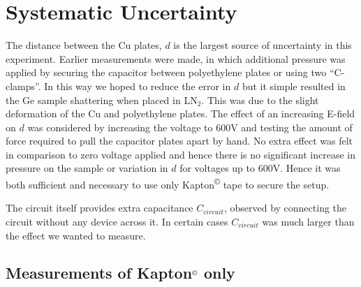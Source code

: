 \documentclass[a4paper,11pt]{article}
\begin{document}
\section{Systematic Uncertainty}
\label{s:sysUncertainty}

The distance between the Cu plates, $d$ is the largest source of uncertainty in this experiment. Earlier measurements were made, in which additional pressure was applied by securing the capacitor between polyethylene plates or using two ``C-clamps''. In this way we hoped to reduce the error in $d$ but it simple resulted in the Ge sample shattering when placed in LN$_{2}$. This was due to the slight deformation of the Cu and polyethylene plates. The effect of an increasing E-field on $d$ was considered by increasing the voltage to 600V and testing the amount of force required to pull the capacitor plates apart by hand. No extra effect was felt in comparison to zero voltage applied and hence there is no significant increase in pressure on the sample or variation in $d$ for voltages up to 600V. Hence it was both sufficient and necessary to use only Kapton\textsuperscript{\copyright} tape to secure the setup.

The circuit itself provides extra capacitance $C_{circuit}$, observed by connecting the circuit without any device across it. In certain cases $C_{circuit}$ was much larger than the effect we wanted to measure.


\subsection{Measurements of Kapton$\textsuperscript{\copyright}$ only}
\label{ss:kapOnly}
\end{document}
